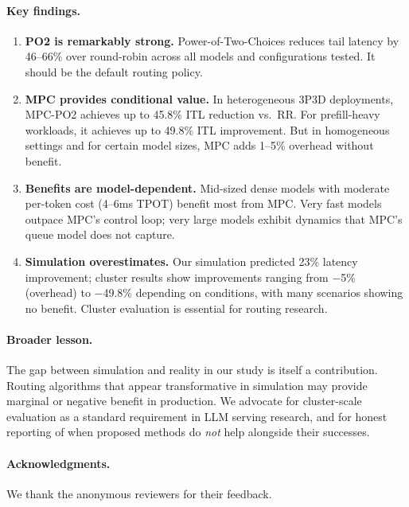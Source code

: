 \documentclass[runningheads]{llncs}
\begin{document}
\paragraph{Key findings.}
\begin{enumerate}
    \item \textbf{PO2 is remarkably strong.} Power-of-Two-Choices reduces tail latency by 46--66\% over round-robin across all models and configurations tested. It should be the default routing policy.
    
    \item \textbf{MPC provides conditional value.} In heterogeneous 3P3D deployments, MPC-PO2 achieves up to 45.8\% ITL reduction vs.\ RR. For prefill-heavy workloads, it achieves up to 49.8\% ITL improvement. But in homogeneous settings and for certain model sizes, MPC adds 1--5\% overhead without benefit.
    
    \item \textbf{Benefits are model-dependent.} Mid-sized dense models with moderate per-token cost (4--6ms TPOT) benefit most from MPC. Very fast models outpace MPC's control loop; very large models exhibit dynamics that MPC's queue model does not capture.
    
    \item \textbf{Simulation overestimates.} Our simulation predicted 23\% latency improvement; cluster results show improvements ranging from $-$5\% (overhead) to $-$49.8\% depending on conditions, with many scenarios showing no benefit. Cluster evaluation is essential for routing research.
\end{enumerate}

\paragraph{Broader lesson.} The gap between simulation and reality in our study is itself a contribution. Routing algorithms that appear transformative in simulation may provide marginal or negative benefit in production. We advocate for cluster-scale evaluation as a standard requirement in LLM serving research, and for honest reporting of when proposed methods do \textit{not} help alongside their successes.

\paragraph{Acknowledgments.} We thank the anonymous reviewers for their feedback.
\end{document}

